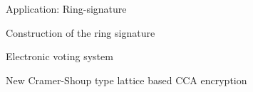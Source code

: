 \begin{section}{Application: Ring-signature}
\begin{subsection}{Construction of the ring signature}
  \end{subsection}
\end{section}

\begin{section}{Electronic voting system}
\end{section}

\begin{section}{New Cramer-Shoup type lattice based CCA encryption}
\end{section}
